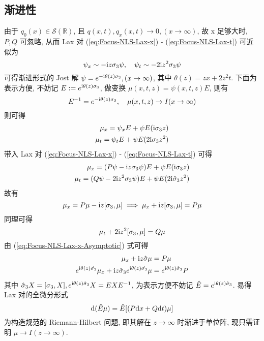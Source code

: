 \subsection{渐进性}

由于 $ q_{0}(x) \in \mathcal{S}(\mathbb{R}) $, 且 $ q(x,t), q_{x}(x,t) \to 0, (x \to \infty) $, 故 x 足够大时, $ P, Q $ 可忽略, 从而 Lax 对 (\ref{eq:Focus-NLS-Lax-x}) - (\ref{eq:Focus-NLS-Lax-t}) 可近似为
\begin{equation*}
  \psi_{x} \sim - \mathrm{i} z \sigma_{3} \psi, \quad \psi_{t} \sim - 2\mathrm{i} z^2 \sigma_{3} \psi
\end{equation*}
可得渐进形式的 Jost 解 $ \psi = e^{- \mathrm{i} \theta(z) \sigma_{3}}, (x \to \infty) $, 其中 $ \theta(z) = z x + 2z^2 t $. 下面为表示方便, 不妨记 $ E := e^{ \mathrm{i} \theta(z) \sigma_{3}} $, 做变换 $ \mu(x,t,z) = \psi(x,t,z)E $, 则有
\begin{equation}
  E^{-1} = e^{-\mathrm{i} \theta(z) \sigma_{3}}, \quad \mu(x,t,z) \to I( x \to \infty) \label{eq:mu-asymptomatic}
\end{equation}
则可得 
\begin{align}
  \mu_{x} = \psi_{x}E + \psi E (\mathrm{i} \sigma_{3} z) \\
  \mu_{t} = \psi_{t}E + \psi E (2 \mathrm{i} \sigma_{3} z^2)
\end{align}
带入 Lax 对 (\ref{eq:Focus-NLS-Lax-x}) - (\ref{eq:Focus-NLS-Lax-t}) 可得
\begin{align}
  \mu_{x} = (P \psi - \mathrm{i} z \sigma_{3} \psi)E + \psi E(\mathrm{i} \sigma_{3} z) \\
  \mu_{t} = (Q \psi - 2 \mathrm{i} z^2 \sigma_{3} \psi)E + \psi E (2 \mathrm{i} \hat{\sigma}_{3} z^2)
\end{align}
故有 
\begin{equation}
  \mu_{x} = P\mu -\mathrm{i} z [\sigma_{3}, \mu] \implies \mu_{x} + \mathrm{i} z [\sigma_{3}, \mu] = P \mu \label{eq:Focus-NLS-Lax-x-Asymptotic}
\end{equation}
同理可得
\begin{equation}
  \mu_{t} + 2 \mathrm{i} z^2 [\sigma_{3}, \mu] = Q \mu \label{eq:Focus-NLS-Lax-t-Asymptotic}
\end{equation}
由 (\ref{eq:Focus-NLS-Lax-x-Asymptotic}) 式可得
\begin{align}
  \mu_{x} + \mathrm{i} z \hat{\sigma} \mu &= P \mu \\
  e^{\mathrm{i} \theta(z) \hat{\sigma_{3}}} \mu_{x} + \mathrm{i} z \hat{\sigma}_{3} e^{\mathrm{i} \theta(z) \hat{\sigma_{3}}} \mu &= e^{\mathrm{i} \theta(z) \hat{\sigma}_{3}} P
\end{align}
其中 $ \hat{\sigma}_{3}X = [\sigma_{3}, X], e^{\mathrm{i} \theta(z) \hat{\sigma}_{3}} X = E X E^{-1} $, 为表示方便不妨记 $ \hat{E} = e^{\mathrm{i} \theta(z) \hat{\sigma}_{3}} $. 
易得 Lax 对的全微分形式
\begin{equation}
  \mathrm{d} (\hat{E} \mu) = \hat{E} [ (P \mathrm{d} x + Q \mathrm{d} t) \mu ] \label{eq:diffision-mu}
\end{equation}
为构造规范的 Riemann-Hilbert 问题, 即其解在 $ z \to \infty $ 时渐进于单位阵, 现只需证明 $ \mu \to I (z \to \infty) $. 

